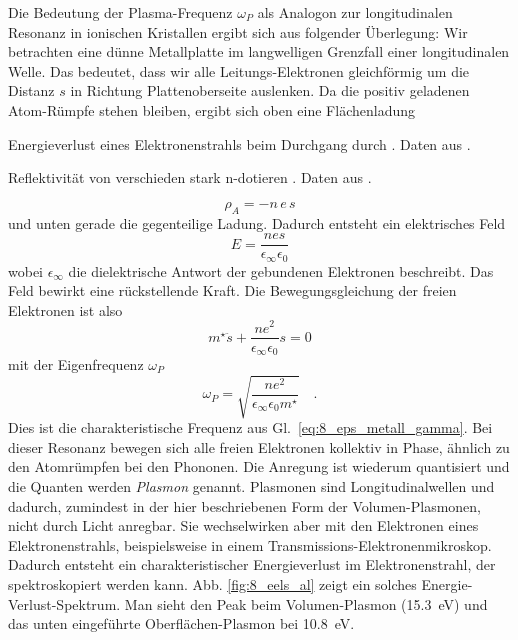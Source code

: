 Die Bedeutung der Plasma-Frequenz $\omega_P$ als Analogon zur longitudinalen Resonanz in ionischen Kristallen ergibt sich aus folgender Überlegung: Wir betrachten eine dünne Metallplatte im langwelligen Grenzfall einer longitudinalen Welle. Das bedeutet, dass wir alle Leitungs-Elektronen gleichförmig um die Distanz $s$ in Richtung Plattenoberseite  auslenken. Da die positiv geladenen Atom-Rümpfe stehen bleiben, ergibt sich oben eine Flächenladung
%
\begin{marginfigure}
    \caption{Energieverlust eines Elektronenstrahls beim Durchgang durch . Daten aus \cite{Powell1959}. 
    \label{fig:8_eels_al} }
\end{marginfigure}
%
\begin{marginfigure}
    \caption{Reflektivität von verschieden stark n-dotieren . Daten aus \cite{Spitzer1957}.
    \label{fig:8_insb_plasmon} } 
\end{marginfigure}
%
\begin{equation}
    \rho_A = - n \, e \, s
\end{equation}
und unten gerade die gegenteilige Ladung. Dadurch entsteht ein elektrisches Feld 
\begin{equation}
    E = \frac{n e s}{\epsilon_\infty \epsilon_0}
\end{equation}
wobei $\epsilon_\infty$ die dielektrische Antwort der gebundenen Elektronen beschreibt. Das Feld bewirkt eine rückstellende Kraft. Die Bewegungsgleichung der freien Elektronen ist also
\begin{equation}
    m^\star \ddot{s} +  \frac{n e^2}{\epsilon_\infty \epsilon_0} s = 0
\end{equation}
mit der Eigenfrequenz $\omega_P$
\begin{equation}
    \omega_P = \sqrt{\frac{n e^2}{\epsilon_\infty \epsilon_0 m^\star}} \quad .
\end{equation}
Dies ist die charakteristische Frequenz aus Gl.~\ref{eq:8_eps_metall_gamma}. Bei dieser Resonanz bewegen sich alle freien Elektronen kollektiv in Phase, ähnlich zu den Atomrümpfen bei den Phononen. Die Anregung ist wiederum quantisiert und die Quanten werden \emph{Plasmon} genannt. Plasmonen sind Longitudinalwellen und dadurch, zumindest in der hier beschriebenen Form der Volumen-Plasmonen, nicht durch Licht anregbar. Sie wechselwirken aber mit den Elektronen eines Elektronenstrahls, beispielsweise in einem Transmissions-Elektronenmikroskop. Dadurch entsteht ein charakteristischer Energieverlust im Elektronenstrahl, der spektroskopiert werden kann. Abb. \ref{fig:8_eels_al} zeigt ein solches Energie-Verlust-Spektrum. Man sieht den Peak beim Volumen-Plasmon (15.3~eV) und das unten eingeführte Oberflächen-Plasmon bei 10.8~eV.

